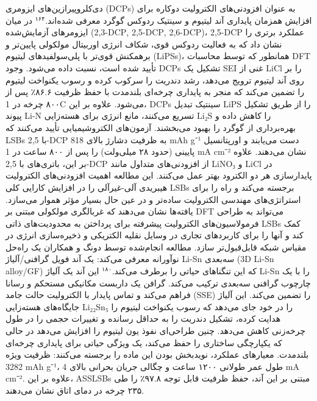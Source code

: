 \documentclass[12pt,a4paper,twocolumn]{article} %
\newcommand{\persian}[1]{\textfarsi{#1}}
\newcommand{\english}[1]{\textenglish{#1}}
\begin{document}
\persian{
دی‌کلروپیرازین‌های ایزومری (\english{DCPs}) به عنوان افزودنی‌های الکترولیت دوکاره برای افزایش همزمان پایداری آند لیتیوم و سینتیک ردوکس گوگرد معرفی شده‌اند.$^{۱۶۴}$ در میان ایزومرهای آزمایش‌شده (\english{2,3-DCP}, \english{2,5-DCP}, \english{2,6-DCP})، \english{2,5-DCP} عملکرد برتری را نشان داد که به فعالیت ردوکس قوی، شکاف انرژی اوربیتال مولکولی پایین‌تر و برهمکنش قوی‌تر با پلی‌سولفیدهای لیتیوم (\english{LiPSs})، همانطور که توسط محاسبات \english{DFT} تأیید شده است، نسبت داده می‌شود. وجود \english{DCPs} تشکیل یک \english{SEI} غنی از \english{LiCl} را بر روی آند لیتیوم ترویج می‌دهد، رشد دندریت را سرکوب کرده و رسوب یکنواخت لیتیوم را تضمین می‌کند که منجر به پایداری چرخه‌ای بلندمدت با حفظ ظرفیت ۸۶.۶٪ پس از ۸۰۰ چرخه در \english{1C} می‌شود. علاوه بر این، \english{DCPs} سینتیک تبدیل \english{LiPS} را از طریق تشکیل پیوند \english{Li-N} تسریع می‌کنند، مانع انرژی برای هسته‌زایی \english{Li₂S} را کاهش داده و بهره‌برداری از گوگرد را بهبود می‌بخشند. آزمون‌های الکتروشیمیایی تأیید می‌کنند که \english{LSBs} با \english{2,5-DCP} به ظرفیت دشارژ بالای \english{818 mAh g⁻¹} دست می‌یابند و اورپتانسیل پایینی (حدود ۲۸ میلی‌ولت) را پس از ۸۰۰ ساعت در \english{1 mA cm⁻²} نشان می‌دهند. علاوه بر این، باتری‌های با \english{2,5-DCP} از افزودنی‌های متداول مانند \english{LiNO₃} و \english{LiCl} در پایدارسازی هر دو الکترود بهتر عمل می‌کنند. این مطالعه اهمیت افزودنی‌های الکترولیت هیبریدی آلی-غیرآلی را در افزایش کارایی کلی \english{LSBs} برجسته می‌کند و راه را برای استراتژی‌های مهندسی الکترولیت ساده‌تر و در عین حال بسیار مؤثر هموار می‌سازد. یافته‌ها نشان می‌دهند که غربالگری مولکولی مبتنی بر \english{DFT} می‌تواند به طراحی فرمولاسیون‌های الکترولیت پیشرفته برای پرداختن به محدودیت‌های ذاتی \english{LSBs} کمک کند و آنها را برای کاربردهای تجاری در وسایل نقلیه الکتریکی و ذخیره‌سازی انرژی در مقیاس شبکه قابل‌قبول‌تر سازد.
}
\persian{
مطالعه انجام‌شده توسط دونگ و همکاران یک راه‌حل نوآورانه معرفی می‌کند: یک آند فویل گرافنی/آلیاژ \english{Li-Sn} سه‌بعدی (\english{3D Li-Sn alloy/GF}) که این تنگناهای حیاتی را برطرف می‌کند.$^{۱۸۰}$ این آند یک آلیاژ \english{Li-Sn} را با یک چارچوب گرافنی سه‌بعدی ترکیب می‌کند. گرافن یک داربست مکانیکی مستحکم و رسانا فراهم می‌کند و تماس پایدار با الکترولیت حالت جامد (\english{SSE}) را تضمین می‌کند. این آلیاژ جایگاه‌های هسته‌زایی \english{Li₂₂Sn₅} را در خود جای می‌دهد که رسوب یکنواخت لیتیوم را هدایت کرده، تشکیل دندریت را به حداقل رسانده و تغییرات حجمی را در طول چرخه‌زنی کاهش می‌دهد. چنین طراحی‌ای نفوذ یون لیتیوم را افزایش می‌دهد در حالی که یکپارچگی ساختاری را حفظ می‌کند، یک ویژگی حیاتی برای پایداری چرخه‌ای بلندمدت. معیارهای عملکرد، نویدبخش بودن این ماده را برجسته می‌کنند: ظرفیت ویژه \english{3282 mAh g⁻¹}، طول عمر طولانی ۱۲۰۰ ساعت و چگالی جریان بحرانی بالای \english{4 mA cm⁻²}. علاوه بر این، \english{ASSLSBs} مبتنی بر این آند، حفظ ظرفیت قابل توجه ۹۷.۸٪ را طی ۲۳۵ چرخه در دمای اتاق نشان می‌دهند.
}
\end{document}
